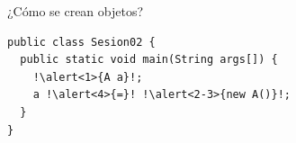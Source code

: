 \documentclass[14pt]{beamer}
\begin{document}
\begin{frame}[fragile]{\alert{\programar} ¿Cómo se crean objetos?}
  \smaller
  \begin{lstlisting}[escapeinside=!!]
public class Sesion02 {
  public static void main(String args[]) {
    !\alert<1>{A a}!;
    a !\alert<4>{=}! !\alert<2-3>{new A()}!;
  }
}
  \end{lstlisting}
  \vspace{-4ex}
  \begin{center}

\end{center}
\end{frame}
\end{document}
